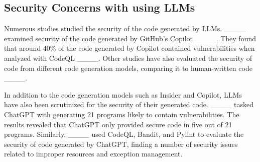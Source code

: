 \subsection{Security Concerns with using LLMs} 
\label{concerns_with_llms_in_se}
Numerous studies studied the security of the code generated by LLMs. %
____ examined security of the code generated by GitHub's Copilot ____. They found that around 40\% of the code generated by Copilot contained vulnerabilities when analyzed with CodeQL ____. Other studies have also evaluated the security of code from different code generation models, comparing it to human-written code ____. %

In addition to the code generation models such as Insider and Copilot, LLMs have also been scrutinized for the security of their generated code. ____ tasked ChatGPT with generating 21 programs likely to contain vulnerabilities. The results revealed that ChatGPT only provided secure code in five out of 21 programs. %
Similarly, ____ used CodeQL, Bandit, and Pylint to evaluate the security of code generated by ChatGPT, finding a number of security issues related to improper resources and exception management.

